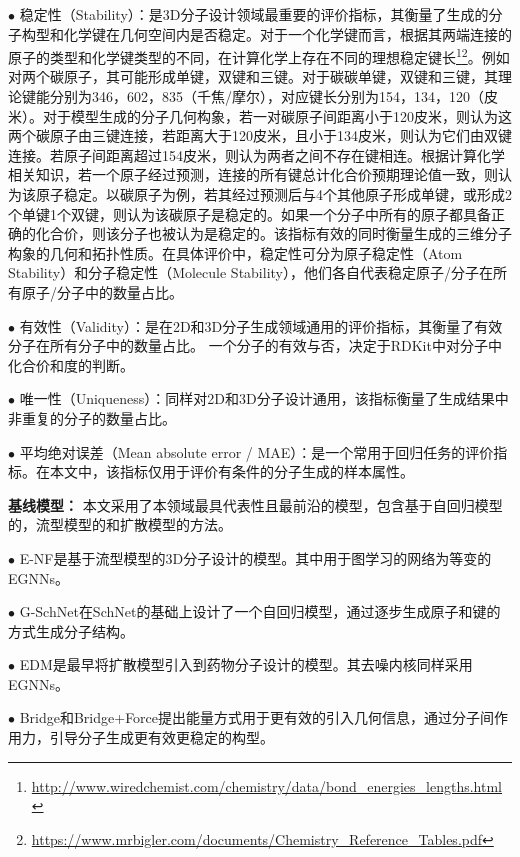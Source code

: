 $\bullet$ 稳定性（Stability）：是3D分子设计领域最重要的评价指标，其衡量了生成的分子构型和化学键在几何空间内是否稳定。对于一个化学键而言，根据其两端连接的原子的类型和化学键类型的不同，在计算化学上存在不同的理想稳定键长\footnote{\url{http://www.wiredchemist.com/chemistry/data/bond_energies_lengths.html}}\footnote{\url{https://www.mrbigler.com/documents/Chemistry_Reference_Tables.pdf}}。例如对两个碳原子，其可能形成单键，双键和三键。对于碳碳单键，双键和三键，其理论键能分别为346，602，835（千焦/摩尔），对应键长分别为154，134，120（皮米）。对于模型生成的分子几何构象，若一对碳原子间距离小于120皮米，则认为这两个碳原子由三键连接，若距离大于120皮米，且小于134皮米，则认为它们由双键连接。若原子间距离超过154皮米，则认为两者之间不存在键相连。根据计算化学相关知识，若一个原子经过预测，连接的所有键总计化合价预期理论值一致，则认为该原子稳定。以碳原子为例，若其经过预测后与4个其他原子形成单键，或形成2个单键1个双键，则认为该碳原子是稳定的。如果一个分子中所有的原子都具备正确的化合价，则该分子也被认为是稳定的。该指标有效的同时衡量生成的三维分子构象的几何和拓扑性质。在具体评价中，稳定性可分为原子稳定性（Atom Stability）和分子稳定性（Molecule Stability），他们各自代表稳定原子/分子在所有原子/分子中的数量占比。

$\bullet$ 有效性（Validity）：是在2D和3D分子生成领域通用的评价指标，其衡量了有效分子在所有分子中的数量占比。 一个分子的有效与否，决定于RDKit中对分子中化合价和度的判断。

$\bullet$ 唯一性（Uniqueness）：同样对2D和3D分子设计通用，该指标衡量了生成结果中非重复的分子的数量占比。

$\bullet$ 平均绝对误差（Mean absolute error / MAE）：是一个常用于回归任务的评价指标。在本文中，该指标仅用于评价有条件的分子生成的样本属性。

\textbf{基线模型：}
本文采用了本领域最具代表性且最前沿的模型，包含基于自回归模型的，流型模型的和扩散模型的方法。

$\bullet$ E-NF\cite{enf_satorras_21}是基于流型模型的3D分子设计的模型。其中用于图学习的网络为等变的EGNNs\cite{egnn_satorras_21}。

$\bullet$ G-SchNet\cite{gschnet_wallach_19}在SchNet\cite{schnet_schutt_17}的基础上设计了一个自回归模型，通过逐步生成原子和键的方式生成分子结构。

$\bullet$ EDM\cite{edm_hoogeboom_22}是最早将扩散模型引入到药物分子设计的模型。其去噪内核同样采用EGNNs\cite{egnn_satorras_21}。

$\bullet$ Bridge和Bridge+Force\cite{diffpg_wu_22}提出能量方式用于更有效的引入几何信息，通过分子间作用力，引导分子生成更有效更稳定的构型。

